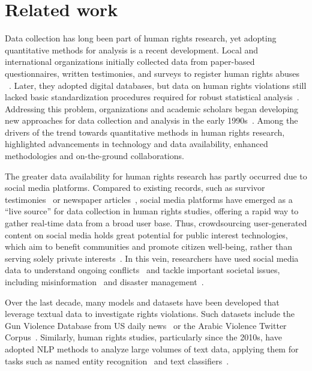 \documentclass[11pt,letterpaper]{article}
\begin{document}
\section{Related work}
\label{chap:related}
Data collection has long been part of human rights research, yet adopting quantitative methods for analysis is a recent development. Local and international organizations initially collected data from paper-based questionnaires, written testimonies, and surveys to register human rights abuses ~\citep{amnesty_international_amnesty_2011, mcclintock_standard_2010}. Later, they adopted digital databases, but data on human rights violations still lacked basic standardization procedures required for robust statistical analysis~\citep{ball_using_2019}. Addressing this problem, organizations and academic scholars began developing new approaches for data collection and analysis in the early 1990s~\citep{jabine_human_1992,ball_using_2019,murdie_quantitative_2021}. Among the drivers of the trend towards quantitative methods in human rights research, \citet{murdie_quantitative_2021} highlighted advancements in technology and data availability, enhanced methodologies and on-the-ground collaborations. 

The greater data availability for human rights research has partly occurred due to social media platforms. Compared to existing records, such as survivor testimonies~\citep{millerDiggingHumanRights2013,gokhaleDeployingCotrainingAlgorithm2017} or newspaper articles~\citep{pavlickGunViolenceDatabase2016,bauerNLPHumanRights2022,ranNewTaskDataset2023}, social media platforms have emerged as a ``live source'' for data collection in human rights studies, offering a rapid way to gather real-time data from a broad user base. Thus, crowdsourcing user-generated content on social media holds great potential for public interest technologies, which aim to benefit communities and promote citizen well-being, rather than serving solely private interests~\citep{abbasSocioTechnicalDesignPublic2021}. In this vein, researchers have used social media data to understand ongoing conflicts~\citep{koliebRespondingHumanRights2018} and tackle important societal issues, including misinformation~\citep{shabaniHybridMachineCrowdApproach2018} and disaster management~\citep{nielsenSocialMediaCrowdsourcing2024}. 

Over the last decade, many models and datasets have been developed that leverage textual data to investigate rights violations. Such datasets include the Gun Violence Database from US daily news~\citep{pavlickGunViolenceDatabase2016} or the Arabic Violence Twitter Corpus~\citep{alhelbawyCorpusViolenceActs2016}. Similarly, human rights studies, particularly since the 2010s, have adopted NLP methods to analyze large volumes of text data, applying them for tasks such as named entity recognition~\citep{gokhaleDeployingCotrainingAlgorithm2017} and text classifiers~\citep{hu_conflibert_2022,alhelbawyNLPPoweredHumanRights2020,gokhaleDeployingCotrainingAlgorithm2017}. 
\end{document}
